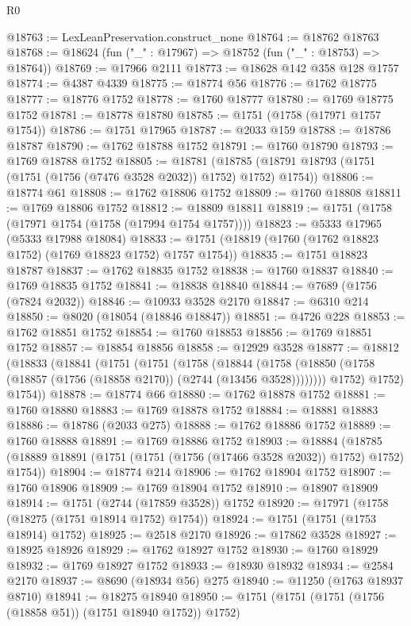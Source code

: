 \begin{lexlean}{R0}
\begin{coremodule}
@18763 := LexLeanPreservation.construct_none
@18764 := @18762 @18763
@18768 := @18624 (fun ("_" : @17967) => @18752 (fun ("_" : @18753) => @18764))
@18769 := @17966 @2111
@18773 := @18628 @142 @358 @128 @1757
@18774 := @4387 @4339
@18775 := @18774 @56
@18776 := @1762 @18775
@18777 := @18776 @1752
@18778 := @1760 @18777
@18780 := @1769 @18775 @1752
@18781 := @18778 @18780
@18785 := @1751 (@1758 (@17971 @1757 @1754))
@18786 := @1751 @17965
@18787 := @2033 @159
@18788 := @18786 @18787
@18790 := @1762 @18788 @1752
@18791 := @1760 @18790
@18793 := @1769 @18788 @1752
@18805 := @18781
    (@18785 (@18791 @18793 (@1751 (@1751 (@1756 (@7476 @3528 @2032)) @1752) @1752) @1754))
@18806 := @18774 @61
@18808 := @1762 @18806 @1752
@18809 := @1760 @18808
@18811 := @1769 @18806 @1752
@18812 := @18809 @18811
@18819 := @1751 (@1758 (@17971 @1754 (@1758 (@17994 @1754 @1757))))
@18823 := @5333 @17965 (@5333 @17988 @18084)
@18833 := @1751 (@18819 (@1760 (@1762 @18823 @1752) (@1769 @18823 @1752) @1757 @1754))
@18835 := @1751 @18823 @18787
@18837 := @1762 @18835 @1752
@18838 := @1760 @18837
@18840 := @1769 @18835 @1752
@18841 := @18838 @18840
@18844 := @7689 (@1756 (@7824 @2032))
@18846 := @10933 @3528 @2170
@18847 := @6310 @214
@18850 := @8020 (@18054 (@18846 @18847))
@18851 := @4726 @228
@18853 := @1762 @18851 @1752
@18854 := @1760 @18853
@18856 := @1769 @18851 @1752
@18857 := @18854 @18856
@18858 := @12929 @3528
@18877 := @18812
    (@18833
      (@18841
        (@1751
          (@1751
            (@1758
              (@18844
                (@1758 (@18850 (@1758 (@18857 (@1756 (@18858 @2170)) (@2744 (@13456 @3528))))))))
            @1752)
          @1752)
        @1754))
@18878 := @18774 @66
@18880 := @1762 @18878 @1752
@18881 := @1760 @18880
@18883 := @1769 @18878 @1752
@18884 := @18881 @18883
@18886 := @18786 (@2033 @275)
@18888 := @1762 @18886 @1752
@18889 := @1760 @18888
@18891 := @1769 @18886 @1752
@18903 := @18884
    (@18785 (@18889 @18891 (@1751 (@1751 (@1756 (@17466 @3528 @2032)) @1752) @1752) @1754))
@18904 := @18774 @214
@18906 := @1762 @18904 @1752
@18907 := @1760 @18906
@18909 := @1769 @18904 @1752
@18910 := @18907 @18909
@18914 := @1751 (@2744 (@17859 @3528)) @1752
@18920 := @17971 (@1758 (@18275 (@1751 @18914 @1752) @1754))
@18924 := @1751 (@1751 (@1753 @18914) @1752)
@18925 := @2518 @2170
@18926 := @17862 @3528
@18927 := @18925 @18926
@18929 := @1762 @18927 @1752
@18930 := @1760 @18929
@18932 := @1769 @18927 @1752
@18933 := @18930 @18932
@18934 := @2584 @2170
@18937 := @8690 (@18934 @56) @275
@18940 := @11250 (@1763 @18937 @8710)
@18941 := @18275 @18940
@18950 := @1751 (@1751 (@1751 (@1756 (@18858 @51)) (@1751 @18940 @1752)) @1752)

\end{coremodule}
\end{lexlean}
